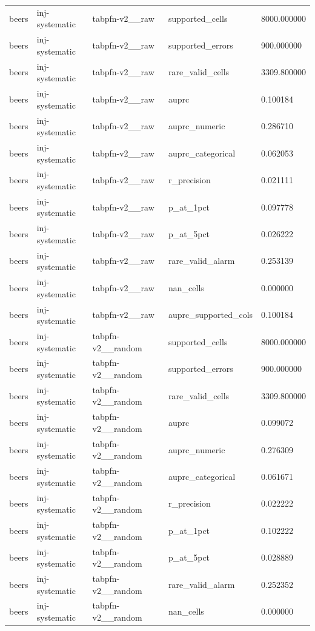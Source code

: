 \begin{tabular}{lllll}
beers & inj-systematic & tabpfn-v2\_\_raw & supported\_cells & 8000.000000 \\
beers & inj-systematic & tabpfn-v2\_\_raw & supported\_errors & 900.000000 \\
beers & inj-systematic & tabpfn-v2\_\_raw & rare\_valid\_cells & 3309.800000 \\
beers & inj-systematic & tabpfn-v2\_\_raw & auprc & 0.100184 \\
beers & inj-systematic & tabpfn-v2\_\_raw & auprc\_numeric & 0.286710 \\
beers & inj-systematic & tabpfn-v2\_\_raw & auprc\_categorical & 0.062053 \\
beers & inj-systematic & tabpfn-v2\_\_raw & r\_precision & 0.021111 \\
beers & inj-systematic & tabpfn-v2\_\_raw & p\_at\_1pct & 0.097778 \\
beers & inj-systematic & tabpfn-v2\_\_raw & p\_at\_5pct & 0.026222 \\
beers & inj-systematic & tabpfn-v2\_\_raw & rare\_valid\_alarm & 0.253139 \\
beers & inj-systematic & tabpfn-v2\_\_raw & nan\_cells & 0.000000 \\
beers & inj-systematic & tabpfn-v2\_\_raw & auprc\_supported\_cols & 0.100184 \\
beers & inj-systematic & tabpfn-v2\_\_random & supported\_cells & 8000.000000 \\
beers & inj-systematic & tabpfn-v2\_\_random & supported\_errors & 900.000000 \\
beers & inj-systematic & tabpfn-v2\_\_random & rare\_valid\_cells & 3309.800000 \\
beers & inj-systematic & tabpfn-v2\_\_random & auprc & 0.099072 \\
beers & inj-systematic & tabpfn-v2\_\_random & auprc\_numeric & 0.276309 \\
beers & inj-systematic & tabpfn-v2\_\_random & auprc\_categorical & 0.061671 \\
beers & inj-systematic & tabpfn-v2\_\_random & r\_precision & 0.022222 \\
beers & inj-systematic & tabpfn-v2\_\_random & p\_at\_1pct & 0.102222 \\
beers & inj-systematic & tabpfn-v2\_\_random & p\_at\_5pct & 0.028889 \\
beers & inj-systematic & tabpfn-v2\_\_random & rare\_valid\_alarm & 0.252352 \\
beers & inj-systematic & tabpfn-v2\_\_random & nan\_cells & 0.000000 \\

\end{tabular}
